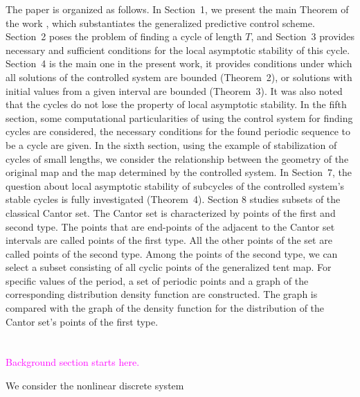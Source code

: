 \documentclass[12pt,a4paper]{amsart}
\begin{document}
The paper is organized as follows. In Section~1, we present the main Theorem of the work \cite{DSI}, which substantiates the generalized 
predictive control scheme. Section~2 poses the problem of finding a cycle of length $T$, and Section~3 provides necessary and sufficient conditions 
for the local asymptotic stability of this cycle. Section~4 is the main one in the present work, it provides conditions under which all solutions 
of the controlled system are bounded (Theorem~2), or solutions with initial values from a given interval are bounded (Theorem~3). It was also 
noted that the cycles do not lose the property of local asymptotic stability. In the fifth section, some computational particularities of using 
the control system for finding cycles are considered, the necessary conditions for the found periodic sequence to be a cycle are given. 
In the sixth section, using the example of stabilization of cycles of small lengths, we consider the relationship between the geometry of the original 
map and the map determined by the controlled system. In Section~7, the question about local asymptotic stability of subcycles of the controlled 
system's stable cycles is fully investigated (Theorem~4). Section 8 studies subsets of the classical Cantor set. The Cantor set is characterized by 
points of the first and second type. The points that are end-points of the adjacent to the Cantor set intervals are called points of the first type. 
All the other points of the set are called points of the second type. Among the points of the second type, we can select a subset consisting 
of all cyclic points of the generalized tent map. For specific values of the period, a set of periodic points and a graph of the corresponding 
distribution density function are constructed. The graph is compared with the graph of the density function for the distribution of the Cantor 
set's points of the first type.


\section{}
\textcolor{magenta}{Background section starts here.}

We consider the nonlinear discrete system 
\end{document}
